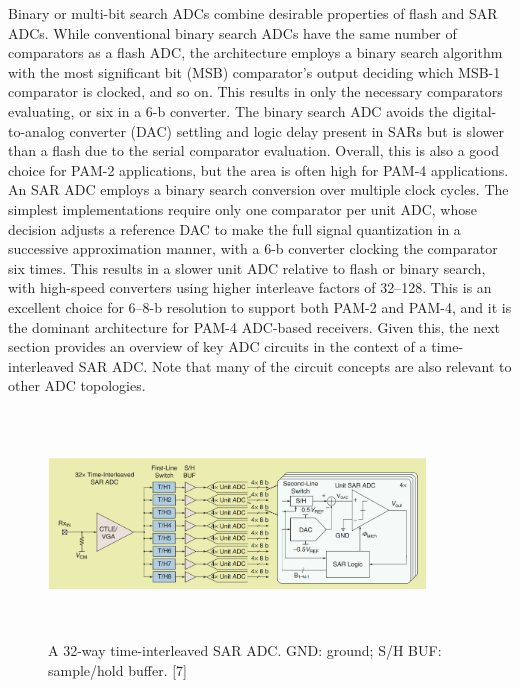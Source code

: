 Binary or multi-bit search ADCs 
combine desirable properties of flash 
and SAR ADCs. While conventional 
binary search ADCs have the same 
number of comparators as a flash 
ADC, the architecture employs a binary search algorithm with the most 
significant bit (MSB) comparator's output deciding which MSB-1 comparator is clocked, and so on. This results 
in only the necessary comparators 
evaluating, or six in a 6-b converter. 
The binary search ADC avoids the digital-to-analog converter (DAC) settling 
and logic delay present in SARs but is 
slower than a flash due to the serial 
comparator evaluation. Overall, this 
is also a good choice for PAM-2 applications, but the area is often high for 
PAM-4 applications.\\
An SAR ADC employs a binary search 
conversion over multiple clock cycles. 
The simplest implementations require 
only one comparator per unit ADC, 
whose decision adjusts a reference DAC 
to make the full signal quantization in a 
successive approximation manner, with 
a 6-b converter clocking the comparator 
six times. This results in a slower unit 
ADC relative to flash or binary search, 
with high-speed converters using higher 
interleave factors of 32–128. 
This is an excellent choice for 6–8-b resolution to support both PAM-2 and PAM-4, 
and it is the dominant architecture for 
PAM-4 ADC-based receivers. Given this, 
the next section provides an overview of key ADC circuits in the context of a time-interleaved SAR ADC. Note that many of 
the circuit concepts are also relevant to 
other ADC topologies.

\begin{figure}[h]
	\centering
	\includegraphics[width=10cm,height=6cm]{fig3_2.png}
	\caption{A 32-way time-interleaved SAR ADC. GND: ground; S/H BUF: sample/hold buffer. [7]}
	\label{TI-ADC}
\end{figure}

